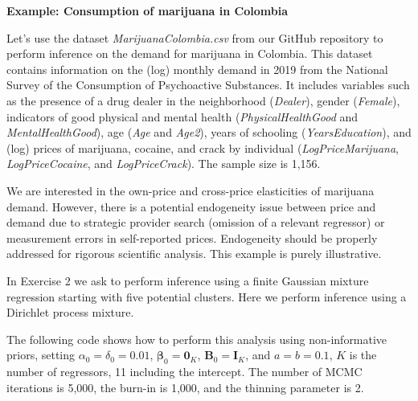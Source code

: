 \textbf{Example: Consumption of marijuana in Colombia}

Let's use the dataset \textit{MarijuanaColombia.csv} from our GitHub repository to perform inference on the demand for marijuana in Colombia. This dataset contains information on the (log) monthly demand in 2019 from the National Survey of the Consumption of Psychoactive Substances. It includes variables such as the presence of a drug dealer in the neighborhood (\textit{Dealer}), gender (\textit{Female}), indicators of good physical and mental health (\textit{PhysicalHealthGood} and \textit{MentalHealthGood}), age (\textit{Age} and \textit{Age2}), years of schooling (\textit{YearsEducation}), and (log) prices of marijuana, cocaine, and crack by individual (\textit{LogPriceMarijuana}, \textit{LogPriceCocaine}, and \textit{LogPriceCrack}). The sample size is 1,156. 

We are interested in the own-price and cross-price elasticities of marijuana demand. However, there is a potential endogeneity issue between price and demand due to strategic provider search (omission of a relevant regressor) or measurement errors in self-reported prices. Endogeneity should be properly addressed for rigorous scientific analysis. This example is purely illustrative.

In Exercise 2 we ask to perform inference using a finite Gaussian mixture regression starting with five potential clusters. Here we perform inference using a Dirichlet process mixture.

The following code shows how to perform this analysis using non-informative priors, setting $\alpha_{0}=\delta_{0}=0.01$, $\boldsymbol{\beta}_{0}=\boldsymbol{0}_K$, $\boldsymbol{B}_{0}=\boldsymbol{I}_K$, and $a=b=0.1$, $K$ is the number of regressors, 11 including the intercept. The number of MCMC iterations is 5,000, the burn-in is 1,000, and the thinning parameter is 2.

